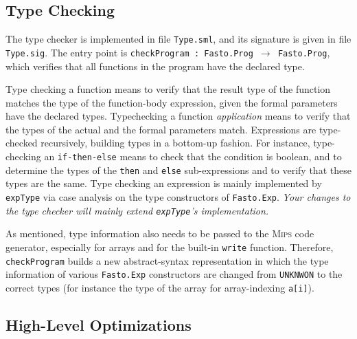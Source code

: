 \documentclass[a4paper,11pt]{article}
\newcommand{\mips}{\textsc{Mips}\xspace}
\begin{document}
\subsection*{Type Checking}

The type checker is implemented in file {\tt Type.sml},
and its signature is given in file {\tt Type.sig}. 
The entry point is {\tt checkProgram : Fasto.Prog $\rightarrow$ Fasto.Prog},
which verifies that all functions in the program have the declared type.

Type checking a function means to verify that the result type of the function
matches the type of the function-body expression, given the formal parameters
have the declared types.
Typechecking a function \emph{application} means to verify that the types of 
the actual and the formal parameters match.
%
Expressions are type-checked recursively, building types in a bottom-up fashion.
For instance, type-checking an {\tt if-then-else} means to
check that the condition is boolean, and to determine the types of the {\tt then}
and {\tt else} sub-expressions and to verify that these types are the same.
%
Type checking an expression is mainly implemented by {\tt expType}
via case analysis on the type constructors of {\tt Fasto.Exp}.
{\it Your changes to the type checker will mainly 
extend {\tt expType}'s implementation.}

As mentioned, type information also needs to be passed to the \mips code 
generator, especially for arrays and for the built-in \texttt{write} function.
Therefore, {\tt checkProgram} builds a new abstract-syntax
representation in which the type information of various
{\tt Fasto.Exp} constructors are changed from {\tt UNKNWON} to the correct types
(for instance the type of the array for array-indexing \texttt{a[i]}).

\subsection*{High-Level Optimizations}
\end{document}
